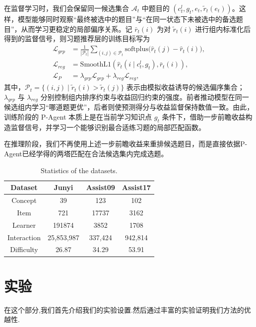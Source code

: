 \documentclass[11pt,a4paper]{article}
\begin{document}
在监督学习时，我们会保留同一候选集合 $\mathcal{A}_t$ 中题目的 $(c_t^l,g_t,e_t,\tilde{r}_t(e_t))$。这样，模型能够同时观察“最终被选中的题目”与“在同一状态下未被选中的备选题目”，从而学习更稳定的局部偏序关系。记 $\bar{r}_t(i)$ 为对 $\tilde{r}_t(i)$ 进行组内标准化后得到的监督信号，则习题推荐层的训练目标写为
\begin{equation}
\begin{aligned}
\mathcal{L}_{grp}
&=
\frac{1}{|\mathcal{P}_t|}
\sum_{(i,j)\in\mathcal{P}_t}
\mathrm{softplus}\!\big(
\hat{r}_{t}(j)-\hat{r}_{t}(i)
\big),\\
\mathcal{L}_{reg}
&=
\mathrm{SmoothL1}\!\left(
\hat{r}_{t}(i\mid c_t^l,g_t),\bar{r}_t(i)
\right),\\
\mathcal{L}_{P}
&=
\lambda_{grp} \mathcal{L}_{grp}
+
\lambda_{reg} \mathcal{L}_{reg},
\end{aligned}
\end{equation}
其中，$\mathcal{P}_t=\{(i,j)\mid \tilde{r}_t(i)>\tilde{r}_t(j)\}$ 表示由模拟收益诱导的候选偏序集合；$\lambda_{grp}$ 与 $\lambda_{reg}$ 分别控制组内排序约束与收益回归约束的强度。前者推动模型在同一候选组内学习“哪道题更优”，后者则使预测得分与收益监督保持数值一致。由此，训练阶段的 P-Agent 本质上是在当前学习知识点 $g_t$ 条件下，借助一步前瞻收益构造监督信号，并学习一个能够识别最合适练习题的局部匹配函数。

在推理阶段，我们不再使用上述一步前瞻收益来重排候选题目，而是直接依据P-Agent已经学得的两塔匹配在合法候选集内完成选题。
\begin{table}[H]
\centering
\captionsetup{labelfont=bf,textfont=bf}
\caption{Statistics of the datasets.}
\label{tab:datasets}
\setlength{\tabcolsep}{4pt}
\footnotesize
\begin{tabular}{cccc}
\toprule
\textbf{Dataset} & \textbf{Junyi} & \textbf{Assist09} & \textbf{Assist17}  \\
\midrule
Concept & 39 & 123 & 102 \\
Item & 721 & 17737 & 3162 \\
Learner & 191874 & 3852 & 1708 \\
Interaction & 25,853,987 & 337,424 & 942,814 \\
Difficulty & 26.87 & 34.29 & 53.91 \\
\bottomrule
\end{tabular}
\end{table}
\section{实验}
在这个部分,我们首先介绍我们的实验设置.然后通过丰富的实验证明我们方法的优越性.
\end{document}
